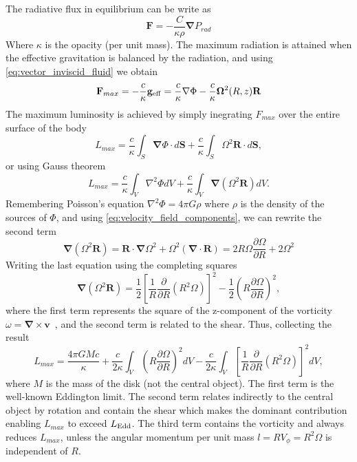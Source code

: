 \documentclass[modern]{aastex62}
\renewcommand{\vec}[1]{\mathbf{#1}}
\begin{document}
The radiative flux in equilibrium can be write as
\begin{equation}
\mathbf{F}= -\frac{C}{\kappa \rho}\mathbf{\nabla}P_{rad}
\end{equation}
Where $\kappa$ is the opacity (per unit mass).
The maximum radiation is attained when the effective gravitation is balanced by the radiation, and using \ref{eq:vector_inviscid_fluid} we obtain
\begin{equation}\label{eq:Fmax-rad}
    \vec F_{max} = -\frac{c}{\kappa}\vec g_{\rm{eff}} = \frac{c}{\kappa}\vec\nabla\Phi - \frac{c}{\kappa}\vec \Omega^2(R,z)\vec R
\end{equation}
The maximum luminosity is achieved by simply inegrating $F_{max}$ over the entire surface of the body
\begin{equation}
    L_{max} = \frac{c}{\kappa} \int_S \vec\nabla\Phi\cdot d\vec S + \frac{c}{\kappa}\int_S \Omega^2\vec R \cdot d\vec S ,
\end{equation}
or using Gauss theorem 
\begin{equation}
    L_{max} = \frac{c}{\kappa} \int_V \nabla^2\Phi dV + \frac{c}{\kappa}\int_V \vec\nabla(\Omega^2\vec R) dV.
\end{equation}
Remembering Poisson's equation $\nabla^2\Phi=4\pi G \rho$ where $\rho$ is the density of the sources of $\Phi$, and using \ref{eq:velocity_field_components}, we can rewrite the second term 
\begin{equation}
    \vec\nabla(\Omega^2\vec R) = \vec R \cdot \vec\nabla\Omega^2 + \Omega^2(\vec\nabla\cdot\vec R) = 2R\Omega \frac{\partial\Omega}{\partial R} + 2\Omega^2
\end{equation}
Writing the last equation using the completing squares
\begin{equation}
    \vec\nabla(\Omega^2\vec R) = \frac{1}{2}\left[ \frac{1}{R}\frac{\partial}{\partial R}(R^2\Omega) \right]^2 - \frac{1}{2} \left( R\frac{\partial \Omega}{\partial R} \right)^2 ,
\end{equation}
where the first term represents the square of the z-component of the vorticity \mbox{ $\omega = \mathbf{\nabla} \times \mathbf{v}$ }, and the second term is related to the shear.
Thus, collecting the result
\begin{equation}
    L_{max}=\frac{4\pi G M c}{\kappa}+
    \frac{c}{2\kappa}\int_V \left( R\frac{\partial \Omega}{\partial R} \right)^2 dV -
    \frac{c}{2\kappa}\int_V \left[ \frac{1}{R}\frac{\partial}{\partial R}(R^2\Omega) \right]^2 dV, 
\end{equation}
where $M$ is the mass of the disk (not the central object).
The first term is the well-known Eddington limit.
The second term relates indirectly to the central object by rotation and contain the shear which makes the dominant contribution enabling $L_{max}$ to exceed $L_{\rm{Edd}}$. The third term contains the vorticity and always reduces $L_{max}$, unless the angular momentum per unit mass $l=RV_\phi=R^2\Omega$ is independent of $R$.
\end{document}
